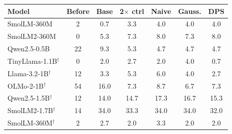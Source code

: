 \begin{tabular}{@{}lcccccc@{}}
\toprule
\textbf{Model} & \textbf{Before} & \textbf{Base} & \textbf{2$\times$ ctrl} & \textbf{Naive} & \textbf{Gauss.} & \textbf{DPS} \\
\midrule
SmolLM-360M & 2 & 0.7 & 3.3 & 4.0 & 4.0 & 4.0 \\
SmolLM2-360M & 0 & 5.3 & 7.3 & 8.0 & 7.3 & 8.0 \\
Qwen2.5-0.5B & 22 & 9.3 & 5.3 & 4.7 & 4.7 & 4.7 \\
TinyLlama-1.1B$^\dagger$ & 0 & 2.0 & 2.7 & 2.0 & 4.0 & 0.7 \\
Llama-3.2-1B$^\dagger$ & 12 & 3.3 & 5.3 & 6.0 & 4.0 & 2.7 \\
OLMo-2-1B$^\dagger$ & 54 & 16.0 & 7.3 & 8.7 & 6.7 & 7.3 \\
Qwen2.5-1.5B$^\dagger$ & 12 & 14.0 & 14.7 & 17.3 & 16.7 & 15.3 \\
SmolLM2-1.7B$^\dagger$ & 14 & 34.0 & 33.3 & 34.0 & 34.0 & 32.0 \\
SmolLM-360M$^\dagger$ & 2 & 2.7 & 2.0 & 3.3 & 2.0 & 2.0 \\
\bottomrule
\end{tabular}
